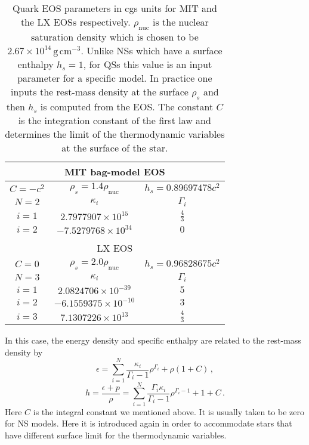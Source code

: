 \documentclass[twocolumn,superscriptaddress,showpacs,prd,aps,amsmath,amssymb,nofootinbib]{revtex4-1}
\begin{document}
\begin{table}
\begin{tabular}{ccc}
\multicolumn{3}{c}{MIT bag-model EOS}  \\
\hline
$C=-c^2$ & $\rho_s=1.4\rho_\mathrm{nuc}$ & $h_s=0.89697478c^2$ \\
\hline
$N=2$ & $\kappa_i$ & $\Gamma_i$  \\
\hline
$i=1$ & $2.7977907\times10^{15}$  & $\frac{4}{3}$ \\
$i=2$ & $-7.5279768\times10^{34}$ & $0$  \\
\hline
\hline  \\[-5pt]
\multicolumn{3}{c}{LX EOS}  \\
\hline
$C=0$ & $\rho_s=2.0\rho_\mathrm{nuc}$ & $h_s=0.96828675c^2$ \\
\hline
$N=3$ & $\kappa_i$ & $\Gamma_i$  \\
\hline
$i=1$ & $ 2.0824706\times10^{-39}$  & $5$  \\
$i=2$ & $ -6.1559375\times10^{-10}$ & $3$  \\
$i=3$ & $ 7.1307226\times10^{13}$   & $\frac{4}{3}$  \\
\hline
\hline
\end{tabular}
\caption{Quark EOS parameters in cgs units for MIT and the LX EOSs
  respectively. $\rho_\mathrm{nuc}$ is the nuclear saturation density
  which is chosen to be $2.67\times10^{14}\,\mathrm{g\, cm^{-3}}$. Unlike
  NSs which have a surface enthalpy $h_s=1$, for QSs this value is an
  input parameter for a specific model. In practice one inputs the
  rest-mass density at the surface $\rho_s$ and then $h_s$ is computed
  from the EOS. The constant $C$ is the integration constant of the first
  law and determines the limit of the thermodynamic variables at the
  surface of the star. }
\label{tab:EOSparfile}
\end{table}


In this case, the energy density and specific enthalpy are related to the
rest-mass density by 
\begin{equation}
\epsilon=\sum\limits_{i=1}^{N}\frac{\kappa_{i}}{\Gamma_{i}-1}\rho^{\Gamma_{i}}+\rho(1+C)\,,
\label{eq:ene}
\end{equation}
\begin{equation}
h=\frac{\epsilon+p}{\rho}=\sum\limits_{i=1}^{N}\frac{\Gamma_{i}\kappa_{i}}{\Gamma_{i}-1}\rho^{\Gamma_{i}-1}+1+C\,.
\label{eq:enthalpy}
\end{equation}
Here $C$ is the integral constant we mentioned above. It is usually taken
to be zero for NS models. Here it is introduced again in order to
accommodate stars that have different surface limit for
the thermodynamic variables.
\end{document}
